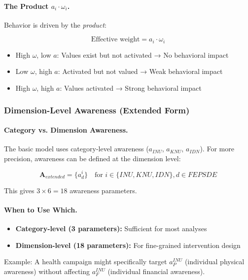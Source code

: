\paragraph{The Product $a_i \cdot \omega_i$.}
Behavior is driven by the \emph{product}:

\begin{equation}
\text{Effective weight} = a_i \cdot \omega_i
\end{equation}

\begin{itemize}
\item High $\omega$, low $a$: Values exist but not activated → No behavioral impact
\item Low $\omega$, high $a$: Activated but not valued → Weak behavioral impact
\item High $\omega$, high $a$: Values activated → Strong behavioral impact
\end{itemize}

\subsubsection{Dimension-Level Awareness (Extended Form)}

\paragraph{Category vs. Dimension Awareness.}
The basic model uses category-level awareness ($a_{INU}$, $a_{KNU}$, $a_{IDN}$).
For more precision, awareness can be defined at the dimension level:

\begin{equation}
\mathbf{A}_{extended} = \{a^i_d\} \quad \text{for } i \in \{INU, KNU, IDN\}, d \in FEPSDE
\end{equation}

This gives $3 \times 6 = 18$ awareness parameters.

\paragraph{When to Use Which.}
\begin{itemize}
\item \textbf{Category-level (3 parameters):} Sufficient for most analyses
\item \textbf{Dimension-level (18 parameters):} For fine-grained intervention design
\end{itemize}

Example: A health campaign might specifically target $a^{INU}_P$ (individual
physical awareness) without affecting $a^{INU}_F$ (individual financial awareness).

